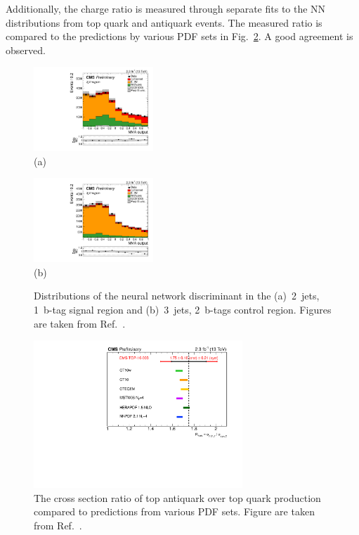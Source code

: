 \documentclass{PoS}
\begin{document}
Additionally, the charge ratio is measured through separate fits to the NN distributions from top quark and antiquark events. The measured ratio is compared to the predictions by various PDF sets in Fig.~\ref{fig:TOP-16-003-2j1t-R}. A good agreement is observed.

\begin{figure}[htbp]
\begin{center}
\parbox[t]{0.49\textwidth}{\centering\includegraphics[width=0.4\textwidth]{figures/tchannel/2j1t_BDT.pdf}\\(a)}
\parbox[t]{0.49\textwidth}{\centering\includegraphics[width=0.4\textwidth]{figures/tchannel/3j1t_BDT.pdf}\\(b)}
\caption{\label{fig:TOP-16-003-2j1t-NN}Distributions of the neural network discriminant in the (a)~2~jets, 1~b-tag signal region and (b)~3~jets, 2~b-tags \ttbar control region. Figures are taken from Ref.~\cite{CMS-PAS-TOP-16-003}.}
\end{center}
\end{figure}



\begin{figure}[htbp]
\begin{center}
\includegraphics[width=0.7\textwidth]{figures/tchannel/ratio.pdf}
\caption{\label{fig:TOP-16-003-2j1t-R}The cross section ratio of top antiquark over top quark production compared to predictions from various PDF sets. Figure are taken from Ref.~\cite{CMS-PAS-TOP-16-003}.}
\end{center}
\end{figure}
\end{document}
